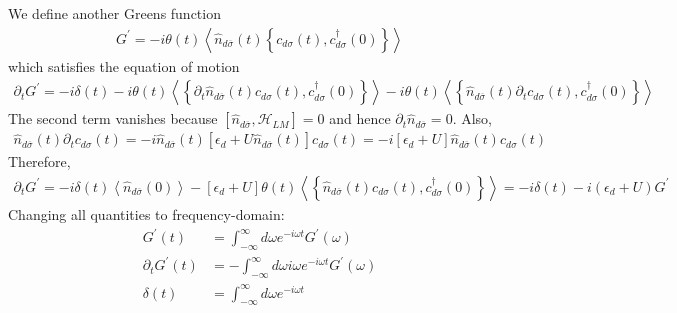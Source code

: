 \documentclass[twoside]{report}
\numberwithin{equation}{section}
\begin{document}
We define another Greens function
\begin{equation}\begin{aligned}
	G^\prime = -i \theta(t) \left<\hat n_{d\overline\sigma}(t)\left\{c_{d\sigma}(t), c^\dagger_{d\sigma}(0) \right\} \right>
\end{aligned}\end{equation}
which satisfies the equation of motion
\begin{equation}\begin{aligned}
	\partial_t G^\prime = -i \delta(t) -i\theta(t) \left<\left\{\partial_t \hat n_{d\overline\sigma}(t)c_{d\sigma}(t), c^\dagger_{d\sigma}(0) \right\} \right> -i\theta(t) \left<\left\{\hat n_{d\overline\sigma}(t)\partial_t c_{d\sigma}(t), c^\dagger_{d\sigma}(0) \right\} \right>
\end{aligned}\end{equation}
The second term vanishes because \(\left[\hat n_{d\overline\sigma}, \mathcal{H}_{LM}\right] = 0\) and hence \(\partial_t \hat n_{d\overline\sigma} = 0\). Also,
\begin{equation}\begin{aligned}
	\hat n_{d\overline\sigma}(t)\partial_t c_{d\sigma}(t) = -i\hat n_{d\overline\sigma}(t)\left[\epsilon_d + U \hat n_{d\overline\sigma}(t)\right]c_{d\sigma}(t) = -i\left[\epsilon_d + U\right]\hat n_{d\overline\sigma}(t)c_{d\sigma}(t)
\end{aligned}\end{equation}
Therefore,
\begin{equation}\begin{aligned}
	\partial_t G^\prime = -i \delta(t) \left< \hat n_{d\overline\sigma}(0)\right>- \left[\epsilon_d + U\right]\theta(t) \left<\left\{\hat n_{d\overline\sigma}(t)c_{d\sigma}(t), c^\dagger_{d\sigma}(0) \right\} \right> = -i \delta(t) -i \left( \epsilon_d + U \right) G^\prime
\end{aligned}\end{equation}
Changing all quantities to frequency-domain:
\begin{equation}\begin{aligned}
	G^\prime(t) &= \int_{-\infty}^\infty d\omega e^{-i\omega t} G^\prime(\omega)\\
	\partial_t G^\prime(t) &= -\int_{-\infty}^\infty d\omega i \omega e^{-i\omega t} G^\prime(\omega)\\
	\delta(t) &= \int_{-\infty}^\infty d\omega e^{-i\omega t}
\end{aligned}\end{equation}
\end{document}
